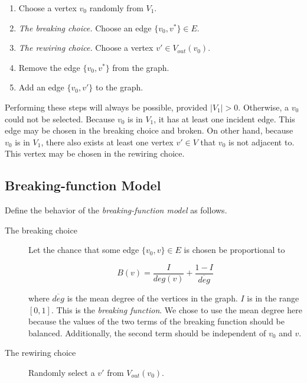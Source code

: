 \documentclass[a4paper,10pt]{article}
\begin{document}
\begin{enumerate}
 \item Choose a vertex $v_0$ randomly from $V_1$. 
 \item \emph{The breaking choice.} Choose an edge $\{v_0, v^*\} \in E$. 
 \item \emph{The rewiring choice.} Choose a vertex $v' \in V_{out}(v_0)$.
 \item Remove the edge $\{v_0, v^*\}$ from the graph.
 \item Add an edge $\{v_0, v'\}$ to the graph.

\end{enumerate}

Performing these steps will always be possible, provided $|V_1| > 0$. Otherwise, a $v_0$ could not be selected. Because $v_0$ is in $V_1$, it has at least one incident edge. This edge may be chosen in the breaking choice and broken. On other hand, because $v_0$ is in $V_1$, there also exists at least one vertex $v' \in V$ that $v_0$ is not adjacent to. This vertex may be chosen in the rewiring choice. 

\subsection{Breaking-function Model}

Define the behavior of the \emph{breaking-function model} as follows.

\begin{description}
 \item[The breaking choice]

 Let the chance that some edge $\{v_0, v\} \in E$ is chosen be proportional to

 \begin{equation}
\label{eqn:breaking-function}
 B(v) = \frac{I}{deg(v)} + \frac{1 - I}{\overline{deg}}
 \end{equation}

where $\overline{deg}$ is the mean degree of the vertices in the graph. $I$ is in the range $[0, 1]$. This is the \emph{breaking function}. We chose to use the mean degree here because the values of the two terms of the breaking function should be balanced. Additionally, the second term should be independent of $v_0$ and $v$.

 \item[The rewiring choice] Randomly select a $v'$ from $V_{out}(v_0)$.
\end{description}
\end{document}
